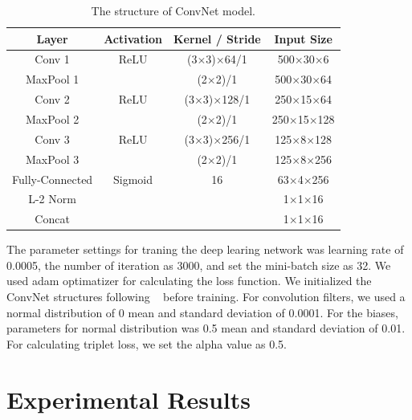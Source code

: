 \begin{table}[]
    \caption{The structure of ConvNet model.}
    \label{conv_structure}
    \centering
    \begin{tabular}{|c|c|c|c|}
    \hline
    Layer     & Activation & Kernel / Stride & Input Size \\ \hline
    Conv 1    & ReLU       & (3$\times$3)$\times$64/1      & 500$\times$30$\times$6   \\
    MaxPool 1 &            & (2$\times$2)/1         & 500$\times$30$\times$64  \\
    Conv 2    & ReLU       & (3$\times$3)$\times$128/1     & 250$\times$15$\times$64 \\
    MaxPool 2 &            & (2$\times$2)/1         & 250$\times$15$\times$128 \\
    Conv 3    & ReLU       & (3$\times$3)$\times$256/1     & 125$\times$8$\times$128  \\
    MaxPool 3 &            & (2$\times$2)/1         & 125$\times$8$\times$256  \\
    Fully-Connected     & Sigmoid    & 16             & 63$\times$4$\times$256   \\
    L-2 Norm  &            &                 & 1$\times$1$\times$16    \\
    Concat    &            &                 & 1$\times$1$\times$16    \\ \hline
    \end{tabular}
\end{table}
The parameter settings for traning the deep learing network was 
learning rate of 0.0005, the number of iteration as 3000, and set the mini-batch size as 32. We used adam optimatizer for calculating the loss function. We initialized the ConvNet structures following ~\cite{koch2015siamese} before training. For convolution filters, we used a normal distribution of 0 mean and standard deviation of 0.0001. For the biases, parameters for normal distribution was 0.5 mean and standard deviation of 0.01. For calculating triplet loss, we set the alpha value as 0.5.

\section{Experimental Results}
